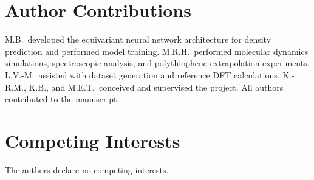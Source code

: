 \documentclass[12pt]{article}
\begin{document}
\section*{Author Contributions}
M.B.\ developed the equivariant neural network architecture for density prediction and performed model training. M.R.H.\ performed molecular dynamics simulations, spectroscopic analysis, and polythiophene extrapolation experiments. L.V.-M.\ assisted with dataset generation and reference DFT calculations. K.-R.M., K.B., and M.E.T.\ conceived and supervised the project. All authors contributed to the manuscript.

\section*{Competing Interests}
The authors declare no competing interests.
\end{document}
